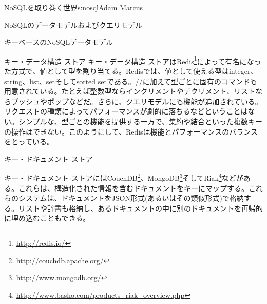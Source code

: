 \begin{aosachapter}{NoSQLを取り巻く世界}{s:nosql}{Adam Marcus}
\begin{aosasect1}{NoSQLのデータモデルおよびクエリモデル}
\begin{aosasect2}{キーベースのNoSQLデータモデル}
\begin{aosasect3}{キー・データ構造 ストア}
キー・データ構造 ストアはRedis\footnote{\url{http://redis.io/}}によって有名になった方式で、値として型を割り当てる。Redisでは、値として使える型はinteger、string、list、setそしてsorted setである。//に加えて型ごとに固有のコマンドも用意されている。たとえば整数型ならインクリメントやデクリメント、リストならプッシュやポップなどだ。さらに、クエリモデルにも機能が追加されている。リクエストの種類によってパフォーマンスが劇的に落ちるなどということはない。シンプルな、型ごとの機能を提供する一方で、集約や結合といった複数キーの操作はできない。このようにして、Redisは機能とパフォーマンスのバランスをとっている。

\end{aosasect3}

\begin{aosasect3}{キー・ドキュメント ストア}

キー・ドキュメント ストアにはCouchDB\footnote{\url{http://couchdb.apache.org/}}、MongoDB\footnote{\url{http://www.mongodb.org/}}そしてRiak\footnote{\url{http://www.basho.com/products_riak_overview.php}}などがある。これらは、構造化された情報を含むドキュメントをキーにマップする。これらのシステムは、ドキュメントをJSON形式(あるいはその類似形式)で格納する。リストや辞書も格納し、あるドキュメントの中に別のドキュメントを再帰的に埋め込むこともできる。


\end{aosasect3}
\end{aosasect2}
\end{aosasect1}
\end{aosachapter}
